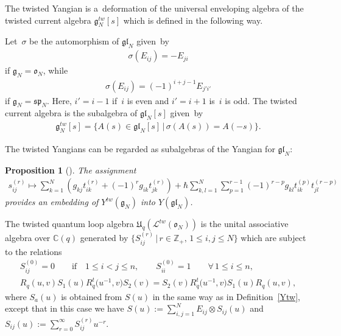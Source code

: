 \documentclass[11pt]{article}
\newtheorem{proposition}{Proposition}
\numberwithin{theorem}{section}
\numberwithin{proposition}{section}
\numberwithin{lemma}{section}
\numberwithin{corollary}{section}
\numberwithin{definition}{section}
\numberwithin{example}{section}
\numberwithin{remark}{section}
\numberwithin{note}{section}
\numberwithin{equation}{section}
\begin{document}
The twisted Yangian is a~deformation of the universal enveloping algebra of the twisted current algebra
$\mathfrak{g}_N^{tw}[s]$ which is def\/ined in the following way.

\begin{definition}
Let~$\sigma$ be the automorphism of $\mathfrak{gl}_N$ given~by
\begin{gather}
\label{orthauto}
\sigma(E_{ij})=-E_{ji}
\end{gather}
if $\mathfrak{g}_N=\mathfrak{o}_N$, while
\begin{gather}
\label{sympauto}
\sigma(E_{ij})=(-1)^{i+j-1}E_{j'i'}
\end{gather}
if $\mathfrak{g}_N=\mathfrak{sp}_N$.
Here, $i'=i-1$ if~$i$ is even and $i'=i+1$ is~$i$ is odd.
The twisted current algebra is the subalgebra of $\mathfrak{gl}_N[s]$ given~by
\begin{gather*}
\mathfrak{g}_N^{tw}[s] = \{A(s) \in \mathfrak{gl}_N[s] \,|\, \sigma(A(s))=A(-s)\}.
\end{gather*}
\end{definition}

The twisted Yangians can be regarded as subalgebras of the Yangian for $\mathfrak{gl}_N$:

\begin{proposition}[\cite{Ol}]
\label{embY}
The assignment
\begin{gather*}
s_{ij}^{(r)} \mapsto \sum\limits_{k=1}^N \left(g_{kj}t_{ik}^{(r)} + (-1)^r g_{ik} t_{jk}^{(r)} \right) + \hbar
\sum\limits_{k,l=1}^N \sum\limits_{p=1}^{r-1} (-1)^{r-p} g_{kl} t_{ik}^{(p)} t_{jl}^{(r-p)}
\end{gather*}
provides an embedding of $Y^{tw}(\mathfrak{g}_N)$ into $Y(\mathfrak{gl}_N)$.
\end{proposition}

\begin{definition}
\label{Uqon}
The twisted quantum loop algebra $\mathfrak{U}_q(\mathcal{L}^{tw}(\mathfrak{o}_N))$ is the unital associative algebra
over $\mathbb{C}(q)$ generated by $\{S_{ij}^{(r)} \,|\, r \in \mathbb{Z}_+, \, 1 \leq i, j \leq N\}$ which are subject to the
relations
\begin{gather*}
S_{ij}^{(0)}=0 \qquad \text{if} \quad  1 \leq i < j \leq n,
\qquad
S_{ii}^{(0)}=1 \qquad \forall\,  1 \leq i \leq n,
\\
R_q(u,v)S_1(u)R_q^t\big(u^{-1},v\big)S_2(v)=S_2(v)R_q^t\big(u^{-1},v\big)S_1(u)R_q(u,v),
\end{gather*}
where $S_a(u)$ is obtained from $S(u)$ in the same way as in Def\/inition~\ref{Ytw}, except that in this case we have
$S(u):=\sum\limits_{i,j=1}^N E_{ij} \otimes S_{ij}(u)$ and $S_{ij}(u):=\sum\limits_{r=0}^\infty S_{ij}^{(r)}u^{-r}$.
\end{definition}
\end{document}
